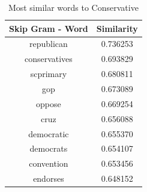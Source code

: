 \documentclass[12pt, authoryear]{elsarticle}
\begin{document}
\begin{center}
\begin{table}[H]
\begin{tabular}{ c c } 
Skip Gram - Word   &  Similarity \\
 \hline
republican    & 0.736253 \\
conservatives    & 0.693829\\
scprimary &    0.680811\\
 gop   &  0.673089\\
oppose   &  0.669254\\
cruz  &   0.656088\\
democratic  &   0.655370\\
democrats   &  0.654107\\
 convention  &   0.653456\\
endorses  &   0.648152\\
 \hline
\end{tabular}
\caption{Most similar words to Conservative}
\label{table:8}
\end{table}
\end{center}
\end{document}
